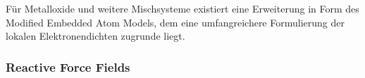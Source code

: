 
Für Metalloxide und weitere Mischsysteme existiert eine Erweiterung in Form des Modified Embedded Atom Models\cite{baskes_modified_1992}, dem eine umfangreichere Formulierung der lokalen Elektronendichten zugrunde liegt.



\subsubsection{Reactive Force Fields}

